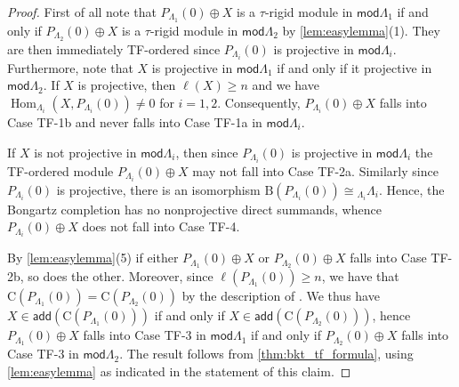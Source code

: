 \documentclass[11pt]{amsart}
\newcommand{\add}{\mathsf{add}}
\newcommand{\mods}{\mathsf{mod}}
\newcommand{\bcomp}{\mathrm{B}}
\newcommand{\ccomp}{\mathrm{C}}
\DeclareMathOperator{\Hom}{\mathrm{Hom}}
\theoremstyle{definition}
\begin{document}
\begin{proof}
    First of all note that $P_{\Lambda_1}(0) \oplus X$ is a $\tau$-rigid module in $\mods \Lambda_1$ if and only if $P_{\Lambda_2}(0) \oplus X$ is a $\tau$-rigid module in $\mods \Lambda_2$ by \cref{lem:easylemma}(1). They are then immediately TF-ordered since $P_{\Lambda_i}(0)$ is projective in $\mods \Lambda_i$.  Furthermore, note that $X$ is projective in $\mods \Lambda_1$ if and only if it projective in $\mods \Lambda_2$. If $X$ is projective, then $\ell(X) \geq n$ and we have $\Hom_{\Lambda_i}(X, P_{\Lambda_i}(0)) \neq 0$ for $i =1,2$. Consequently, $P_{\Lambda_i}(0) \oplus X$ falls into Case TF-1b and never falls into Case TF-1a in $\mods \Lambda_i$. 
    
    If $X$ is not projective in $\mods \Lambda_i$, then since $P_{\Lambda_i}(0)$ is projective in $\mods \Lambda_i$ the TF-ordered module $P_{\Lambda_i}(0) \oplus X$ may not fall into Case TF-2a. Similarly since $P_{\Lambda_i}(0)$ is projective, there is an isomorphism $\bcomp(P_{\Lambda_i}(0)) \cong {}_{\Lambda_i}\Lambda_i$. Hence, the Bongartz completion has no nonprojective direct summands, whence $P_{\Lambda_i}(0) \oplus X$ does not fall into Case TF-4. 

    By \cref{lem:easylemma}(5) if either $P_{\Lambda_1}(0) \oplus X$ or $P_{\Lambda_2}(0) \oplus X$ falls into Case TF-2b, so does the other. Moreover, since $\ell(P_{\Lambda_1}(0)) \geq n$, we have that $\ccomp(P_{\Lambda_1}(0)) = \ccomp(P_{\Lambda_2}(0))$ by the description of \cite[Prop. 4.11]{bkt}. We thus have $X \in \add(\ccomp(P_{\Lambda_1}(0)))$ if and only if $X \in \add(\ccomp(P_{\Lambda_2}(0)))$, hence $P_{\Lambda_1}(0) \oplus X$ falls into Case TF-3 in $\mods \Lambda_1$ if and only if $P_{\Lambda_2}(0) \oplus X$ falls into Case TF-3 in $\mods \Lambda_2$. The result follows from \cref{thm:bkt_tf_formula}, using \cref{lem:easylemma} as indicated in the statement of this claim.
\end{proof}
\end{document}
